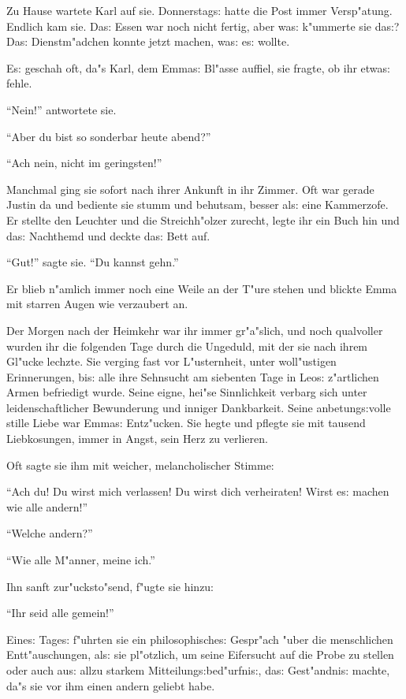\documentclass[oneside,12pt]{book}
\newcommand{\s}{s:}%
\begin{document}
Zu Hause wartete Karl auf sie. Donnerstag{\s} hatte die Post immer
Versp"atung. Endlich kam sie. Da{\s} Essen war noch nicht fertig,
aber wa{\s} k"ummerte sie da{\s}? Da{\s} Dienstm"adchen konnte
jetzt machen, wa{\s} e{\s} wollte.

E{\s} geschah oft, da"s Karl, dem Emma{\s} Bl"asse auffiel, sie
fragte, ob ihr etwa{\s} fehle.

"`Nein!"' antwortete sie.

"`Aber du bist so sonderbar heute abend?"'

"`Ach nein, nicht im geringsten!"'

Manchmal ging sie sofort nach ihrer Ankunft in ihr Zimmer. Oft war
gerade Justin da und bediente sie stumm und behutsam, besser
al{\s} eine Kammerzofe. Er stellte den Leuchter und die
Streichh"olzer zurecht, legte ihr ein Buch hin und da{\s}
Nachthemd und deckte da{\s} Bett auf.

"`Gut!"' sagte sie. "`Du kannst gehn."'

Er blieb n"amlich immer noch eine Weile an der T"ure stehen und
blickte Emma mit starren Augen wie verzaubert an.

Der Morgen nach der Heimkehr war ihr immer gr"a"slich, und noch
qualvoller wurden ihr die folgenden Tage durch die Ungeduld, mit
der sie nach ihrem Gl"ucke lechzte. Sie verging fast vor
L"usternheit, unter woll"ustigen Erinnerungen, bi{\s} alle ihre
Sehnsucht am siebenten Tage in Leo{\s} z"artlichen Armen
befriedigt wurde. Seine eigne, hei"se Sinnlichkeit verbarg sich
unter leidenschaftlicher Bewunderung und inniger Dankbarkeit.
Seine anbetung{\s}volle stille Liebe war Emma{\s} Ent\/z"ucken. Sie
hegte und pflegte sie mit tausend Liebkosungen, immer in Angst,
sein Herz zu verlieren.

Oft sagte sie ihm mit weicher, melancholischer Stimme:

"`Ach du! Du wirst mich verlassen! Du wirst dich verheiraten!
Wirst e{\s} machen wie alle andern!"'

"`Welche andern?"'

"`Wie alle M"anner, meine ich."'

Ihn sanft zur"ucksto"send, f"ugte sie hinzu:

"`Ihr seid alle gemein!"'

Eine{\s} Tage{\s} f"uhrten sie ein philosophische{\s} Gespr"ach
"uber die menschlichen Entt"auschungen, al{\s} sie pl"otzlich, um
seine Eifersucht auf die Probe zu stellen oder auch au{\s} allzu
starkem Mitteilung{\s}bed"urfni{\s}, da{\s} Gest"andni{\s} machte,
da"s sie vor ihm einen andern geliebt habe.
\end{document}
